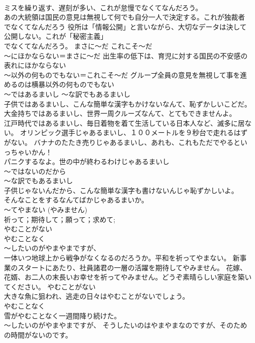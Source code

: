 \documentclass[8pt]{extreport}
\begin{document}
\begin{CJK}{UTF8}{min}
\\	ミスを繰り返す、遅刻が多い、これが怠慢でなくてなんだろう。 
\\	あの大統領は国民の意見は無視して何でも自分一人で決定する。これが独裁者
\\	でなくてなんだろう 役所は「情報公開」と言いながら、大切なデータは決して公開しない。これが「秘密主義」
\\	でなくてなんだろう。	まさに～だ これこそ～だ 
\\	～にほかならない＝まさに～だ 出生率の低下は、育児に対する国民の不安感の表れにほかならない
\\	～以外の何ものでもない＝これこそ～だ グループ全員の意見を無視して事を進めるのは横暴以外の何ものでもない
\\	～ではあるまいし ～な訳でもあるまいし	
\\	子供ではあるまいし、こんな簡単な漢字もかけないなんて、恥ずかしいこどだ。
\\	大金持ちではあるまいし、世界一周クルーズなんて、とてもできませんよ。
\\	江戸時代ではあるまいし、毎日着物を着て生活している日本人など、滅多に居ない。 オリンピック選手じゃあるまいし、１００メートルを９秒台で走れるはずがない。 バナナのたたき売りじゃあるまいし、あれも、これもただでやるといっちゃいかん！
\\	パニクするなよ。世の中が終わるわけじゃあるまいし
\\	～ではないのだから 
\\	～な訳でもあるまいし 
\\	子供じゃないんだから、こんな簡単な漢字も書けないんじゃ恥ずかしいよ。 
\\	そんなことをするなんてばかじゃあるまいか。
\\	～てやまない (やみません) 
\\	祈って；期待して；願って；求めて;
\\	やむことがない 
\\	やむことなく 
\\	～したいのがやまやまですが、	
\\	一体いつ地球上から戦争がなくなるのだろうか。平和を祈ってやまない。 新事業のスタートにあたり、社員諸君の一層の活躍を期待してやみません。 花嫁、花婿、お二人の末長いお幸せを祈ってやみません。どうぞ素晴らしい家庭を築いてください。 やむことがない 
\\	大きな魚に狙われ、逃走の日々はやむことがないでしょう。 
\\	やむことなく 
\\	雪がやむことなく一週間降り続けた。　
\\	～したいのがやまやまですが、 そうしたいのはやまやまなのですが、そのための時間がないのです。　 

\end{CJK}
\end{document}

